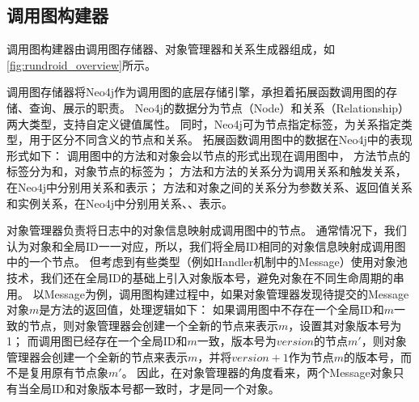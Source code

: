 \subsection{调用图构建器}

调用图构建器由调用图存储器、对象管理器和关系生成器组成，如\autoref{fig:rundroid_overview}所示。

调用图存储器将Neo4j\cite{Neo4jthe19}作为调用图的底层存储引擎，承担着拓展函数调用图的存储、查询、展示的职责。
Neo4j的数据分为节点（Node）和关系（Relationship）两大类型，支持自定义键值属性。
同时，Neo4j可为节点指定标签，为关系指定类型，用于区分不同含义的节点和关系。
拓展函数调用图中的数据在Neo4j中的表现形式如下：
调用图中的方法和对象会以节点的形式出现在调用图中， 方法节点的标签分为和，对象节点的标签为；
方法和方法的关系分为调用关系和触发关系，在Neo4j中分别用关系和表示；
方法和对象之间的关系分为参数关系、返回值关系和实例关系，在Neo4j中分别用关系、、表示。






对象管理器负责将日志中的对象信息映射成调用图中的节点。
通常情况下，我们认为对象和全局ID一一对应，所以，我们将全局ID相同的对象信息映射成调用图中的一个节点。
但考虑到有些类型（例如Handler机制中的Message）使用对象池技术，我们还在全局ID的基础上引入对象版本号，避免对象在不同生命周期的串用。
以Message为例，调用图构建过程中，如果对象管理器发现待提交的Message对象$m$是方法的返回值，处理逻辑如下：
如果调用图中不存在一个全局ID和$m$一致的节点，则对象管理器会创建一个全新的节点来表示$m$，设置其对象版本号为1；
而调用图已经存在一个全局ID和$m$一致，版本号为$version$的节点$m'$，则对象管理器会创建一个全新的节点来表示$m$，并将$version + 1$作为节点$m$的版本号，而不是复用原有节点象$m'$。
因此，在对象管理器的角度看来，两个Message对象只有当全局ID和对象版本号都一致时，才是同一个对象。




